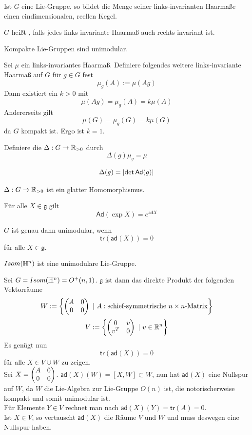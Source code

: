 \documentclass{book}
\newcommand{\g}{\mathfrak{g}}
\begin{document}
\Lem{}
Ist $G$ eine Lie-Gruppe, so bildet die Menge seiner links-invarianten Haarmaße einen eindimensionalen, reellen Kegel.

\Def{}
$G$ heißt , falls jedes links-invariante Haarmaß auch rechts-invariant ist.

\Lem{}
Kompakte Lie-Gruppen sind unimodular.
\begin{Beweis}{}
	Sei $\mu$ ein links-invariantes Haarmaß. Definiere folgendes weitere links-invariante Haarmaß auf $G$ für $g\in G$ fest
	\[ \mu_g(A) := \mu(Ag) \]
	Dann existiert ein $k > 0$ mit
	\[ \mu(Ag) = \mu_g(A) = k \mu(A) \]
	Andererseits gilt
	\[ \mu(G) = \mu_g(G) = k \mu(G) \]
	da $G$ kompakt ist. Ergo ist $k = 1$.
\end{Beweis}

\Def{}
Definiere die  $\Delta : G \overset{}{\rightarrow} \mathbb{R}_{>0}$ durch
\[ \Delta(g) \mu_g = \mu \]

\Prop{}
\[ \Delta(g) = \left|\det \textsf{Ad}(g)\right| \]

\Kor{}
$\Delta : G \overset{}{\rightarrow} \mathbb{R}_{>0}$ ist ein glatter Homomorphismus.

\Bem{}
Für alle $X \in \g$ gilt
\[ \textsf{Ad}(\exp X) = e^{\textsf{ad} X} \]

\Kor{}
$G$ ist genau dann unimodular, wenn
\[ \textsf{tr}(\textsf{ad}(X)) = 0 \]
für alle $X \in \g$.

\Prop{}
$Isom(\mathbb{H}^n)$ ist eine unimodulare Lie-Gruppe.
\begin{Beweis}{}
	Sei $G = Isom(\mathbb{H}^n) = O^+(n,1)$. $\g$ ist dann das direkte Produkt der folgenden Vektorräume
	\[ W := \set{
\klam{
\begin{matrix}
A & 0\\
0 & 0
\end{matrix}
}	
}{A : \text{schief-symmetrische }n\times n \text{-Matrix}} \]
	\[ V := \set{
	\klam{
		\begin{matrix}
		0 & v\\
		v^T & 0
		\end{matrix}
	}	
}{v\in \R^n} \]
Es genügt nun
\[ \textsf{tr}(\textsf{ad}(X)) = 0 \]
für alle $X \in V\cup W$ zu zeigen.\\
Sei $X = \left(
	\begin{matrix}
	A & 0\\
	0 & 0
	\end{matrix}
\right)$. $\textsf{ad}(X)(W) = [X,W] \subset W$, nun hat $\textsf{ad}(X)$ eine Nullspur auf $W$, da $W$ die Lie-Algebra zur Lie-Gruppe $O(n)$ ist, die notorischerweise kompakt und somit unimodular ist.\\
Für Elemente $Y \in V$ rechnet man nach $\textsf{ad}(X)(Y) = \textsf{tr}(A) = 0$.\\
Ist $X \in V$, so vertauscht $\textsf{ad}(X)$ die Räume $V$ und $W$ und muss deswegen eine Nullspur haben.
\end{Beweis}
\end{document}
